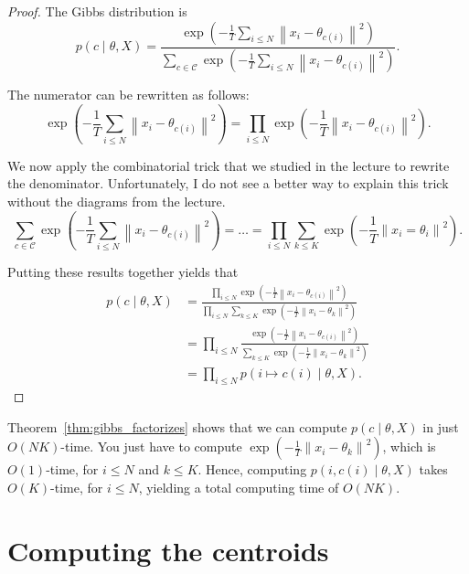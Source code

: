 \begin{proof}
The Gibbs distribution is
%
\begin{equation}
p(c \mid \theta, X) = \frac{\exp\left(- \frac{1}{T}\sum_{i \leq N}\left\|x_i - \theta_{c(i)}\right\|^2\right)}{\sum_{c \in \mathcal{C}}\exp\left(- \frac{1}{T}\sum_{i \leq N}\left\|x_i - \theta_{c(i)}\right\|^2\right)}.
\end{equation}

The numerator can be rewritten as follows:
%
\begin{equation}
\exp\left(- \frac{1}{T}\sum_{i \leq N}\left\|x_i - \theta_{c(i)}\right\|^2\right) = \prod_{i \leq N}\exp\left(- \frac{1}{T}\left\|x_i - \theta_{c(i)}\right\|^2\right).
\end{equation}

We now apply the combinatorial trick that we studied in the lecture
to rewrite the denominator. Unfortunately, I do not see a better way to explain this trick without the diagrams from the lecture.
%
\begin{equation}
\sum_{c \in \mathcal{C}} \exp\left(- \frac{1}{T}\sum_{i \leq N}\left\|x_i - \theta_{c(i)}\right\|^2\right) = \ldots = \prod_{i \leq N} \sum_{k \leq K} \exp\left(-\frac{1}{T}\left\|x_i = \theta_i\right\|^2\right).
\end{equation}

Putting these results together yields that
%
\begin{align}
p(c \mid \theta, X) &= \frac{\prod_{i \leq N}\exp\left(- \frac{1}{T}\left\|x_i - \theta_{c(i)}\right\|^2\right)}{\prod_{i \leq N}\sum_{k \leq K}\exp\left(- \frac{1}{T}\left\|x_i - \theta_{k}\right\|^2\right)}\\
&= \prod_{i \leq N}\frac{\exp\left(- \frac{1}{T}\left\|x_i - \theta_{c(i)}\right\|^2\right)}{\sum_{k \leq K}\exp\left(- \frac{1}{T}\left\|x_i - \theta_{k}\right\|^2\right)}\\
&= \prod_{i \leq N}p(i \mapsto c(i) \mid \theta, X).
\end{align}
\end{proof} 

Theorem~\ref{thm:gibbs_factorizes} shows that we can compute $p(c \mid \theta, X)$ in just $O(NK)$-time.
You just have to compute $\exp\left(- \frac{1}{T}\left\|x_i - \theta_k\right\|^2\right)$, which is $O(1)$-time, for $i \leq N$ and $k \leq K$. Hence, computing $p(i, c(i) \mid \theta, X)$ takes $O(K)$-time, for $i \leq N$, yielding a total computing time of $O(NK)$.

\section{Computing the centroids}
\label{sec:computing_centroids_da}

